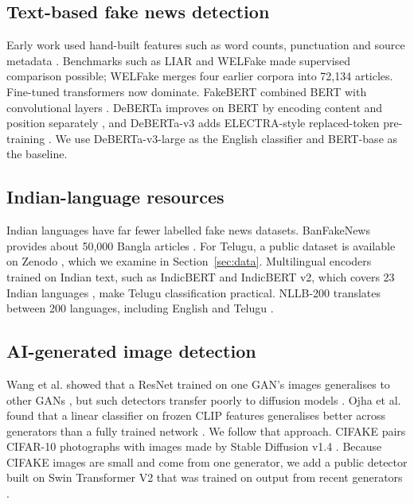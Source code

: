 \documentclass[conference]{IEEEtran}
\begin{document}
\subsection{Text-based fake news detection}
Early work used hand-built features such as word counts, punctuation and source metadata \cite{shu2017fake}. Benchmarks such as LIAR \cite{wang2017liar} and WELFake \cite{verma2021welfake} made supervised comparison possible; WELFake merges four earlier corpora into 72,134 articles. Fine-tuned transformers now dominate. FakeBERT combined BERT \cite{devlin2019bert} with convolutional layers \cite{kaliyar2021fakebert}. DeBERTa improves on BERT by encoding content and position separately \cite{he2021deberta}, and DeBERTa-v3 adds ELECTRA-style replaced-token pre-training \cite{he2023debertav3}. We use DeBERTa-v3-large as the English classifier and BERT-base as the baseline.

\subsection{Indian-language resources}
Indian languages have far fewer labelled fake news datasets. BanFakeNews provides about 50,000 Bangla articles \cite{hossain2020banfakenews}. For Telugu, a public dataset is available on Zenodo \cite{telugu2024zenodo}, which we examine in Section~\ref{sec:data}. Multilingual encoders trained on Indian text, such as IndicBERT \cite{kakwani2020indicnlp} and IndicBERT v2, which covers 23 Indian languages \cite{doddapaneni2023indicbertv2}, make Telugu classification practical. NLLB-200 translates between 200 languages, including English and Telugu \cite{nllb2022}.

\subsection{AI-generated image detection}
Wang et al. showed that a ResNet trained on one GAN's images generalises to other GANs \cite{wang2020cnndetect}, but such detectors transfer poorly to diffusion models \cite{corvi2023diffusion}. Ojha et al. found that a linear classifier on frozen CLIP \cite{radford2021clip} features generalises better across generators than a fully trained network \cite{ojha2023universal}. We follow that approach. CIFAKE pairs CIFAR-10 photographs with images made by Stable Diffusion v1.4 \cite{bird2024cifake,rombach2022ldm}. Because CIFAKE images are small and come from one generator, we add a public detector built on Swin Transformer V2 \cite{liu2022swinv2} that was trained on output from recent generators \cite{haywoodsloan2024detector}.
\end{document}
